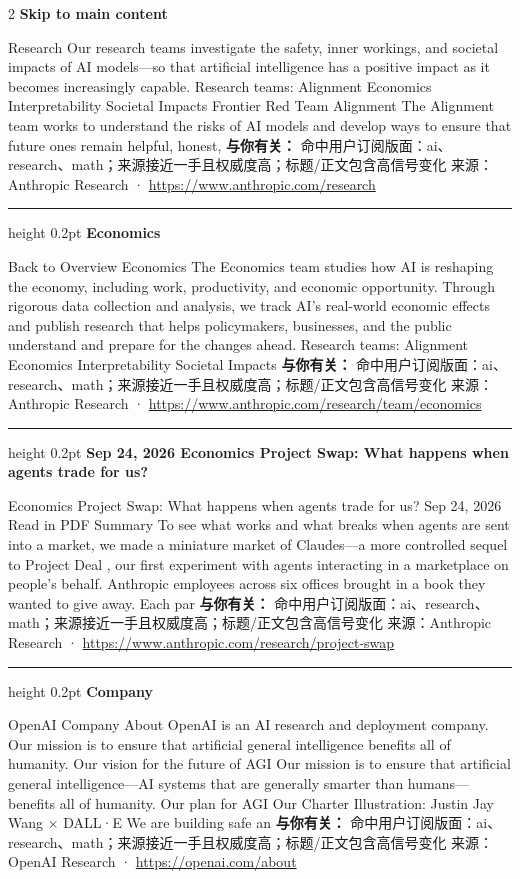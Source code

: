\documentclass[10.5pt]{ctexart}
\begin{document}
\begin{multicols}{2}
{\large\bfseries Skip to main content}\par
Research Our research teams investigate the safety, inner workings, and societal impacts of AI models—so that artificial intelligence has a positive impact as it becomes increasingly capable. Research teams: Alignment Economics Interpretability Societal Impacts Frontier Red Team Alignment The Alignment team works to understand the risks of AI models and develop ways to ensure that future ones remain helpful, honest, 
\textbf{与你有关：} 命中用户订阅版面：ai、research、math；来源接近一手且权威度高；标题/正文包含高信号变化
{\footnotesize\color{ormuted} 来源：Anthropic Research · \url{https://www.anthropic.com/research}}
\vspace{2mm}
\hrule height 0.2pt
\vspace{2mm}
{\large\bfseries Economics}\par
Back to Overview Economics The Economics team studies how AI is reshaping the economy, including work, productivity, and economic opportunity. Through rigorous data collection and analysis, we track AI's real-world economic effects and publish research that helps policymakers, businesses, and the public understand and prepare for the changes ahead. Research teams: Alignment Economics Interpretability Societal Impacts
\textbf{与你有关：} 命中用户订阅版面：ai、research、math；来源接近一手且权威度高；标题/正文包含高信号变化
{\footnotesize\color{ormuted} 来源：Anthropic Research · \url{https://www.anthropic.com/research/team/economics}}
\vspace{2mm}
\hrule height 0.2pt
\vspace{2mm}
{\large\bfseries Sep 24, 2026 Economics Project Swap: What happens when agents trade for us?}\par
Economics Project Swap: What happens when agents trade for us? Sep 24, 2026 Read in PDF Summary To see what works and what breaks when agents are sent into a market, we made a miniature market of Claudes—a more controlled sequel to Project Deal , our first experiment with agents interacting in a marketplace on people's behalf. Anthropic employees across six offices brought in a book they wanted to give away. Each par
\textbf{与你有关：} 命中用户订阅版面：ai、research、math；来源接近一手且权威度高；标题/正文包含高信号变化
{\footnotesize\color{ormuted} 来源：Anthropic Research · \url{https://www.anthropic.com/research/project-swap}}
\vspace{2mm}
\hrule height 0.2pt
\vspace{2mm}
{\large\bfseries Company}\par
OpenAI Company About OpenAI is an AI research and deployment company. Our mission is to ensure that artificial general intelligence benefits all of humanity. Our vision for the future of AGI Our mission is to ensure that artificial general intelligence—AI systems that are generally smarter than humans—benefits all of humanity. Our plan for AGI Our Charter Illustration: Justin Jay Wang × DALL·E We are building safe an
\textbf{与你有关：} 命中用户订阅版面：ai、research、math；来源接近一手且权威度高；标题/正文包含高信号变化
{\footnotesize\color{ormuted} 来源：OpenAI Research · \url{https://openai.com/about}}
\end{multicols}
\end{document}
